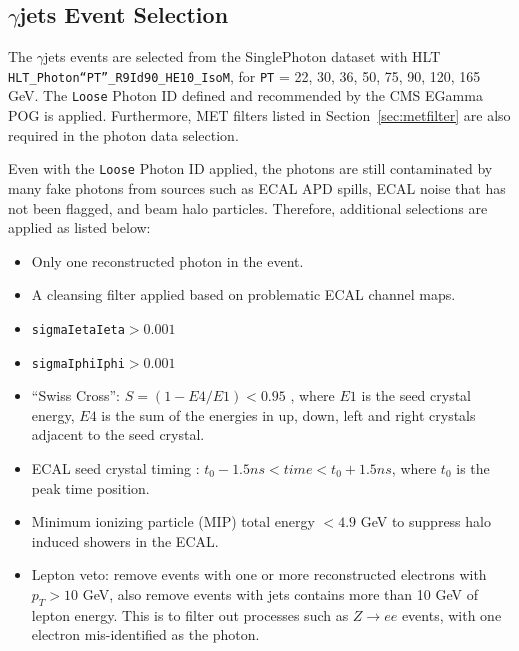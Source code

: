 \subsection{$\gamma$jets Event Selection}\label{sec:bg_gjetsel}
The $\gamma$jets events are selected from the SinglePhoton dataset with HLT \texttt{HLT\_Photon``PT''\_R9Id90\_HE10\_IsoM}, for \texttt{PT} = 22, 30, 36, 50, 75, 90, 120, 165 GeV. The \texttt{Loose} Photon ID defined and recommended by the CMS EGamma POG is applied. Furthermore, MET filters listed in Section~\ref{sec:metfilter} are also required in the photon data selection.

\vspace{0.3cm}
Even with the \texttt{Loose} Photon ID applied, the photons are still contaminated by many fake photons from sources such as ECAL APD spills, ECAL noise that has not been flagged, and beam halo particles. Therefore, additional selections are applied as listed below:
\begin{itemize}
\item Only one reconstructed photon in the event. 
\item A cleansing filter applied based on problematic ECAL channel maps.
\item \texttt{sigmaIetaIeta}$>0.001$
\item \texttt{sigmaIphiIphi}$>0.001$  
\item ``Swiss Cross'':  $S = (1-E4/E1)<0.95$ , where $E1$ is the seed crystal energy, $E4$ is the sum of the energies in up, down, left and right crystals adjacent to the seed crystal.
\item ECAL seed crystal timing :   $t_0-1.5 ns < time < t_0+1.5 ns$, where $t_0$ is the peak time position. 
\item Minimum ionizing particle (MIP) total energy $< 4.9$ GeV to suppress halo induced showers in the ECAL.
\item Lepton veto: remove events with one or more reconstructed electrons with $ p_T > 10$ GeV, 
also remove events with jets contains more than 10 GeV of lepton energy.
This is to filter out processes such as $Z\to ee$ events, with one electron mis-identified as the photon. 
\end{itemize}

